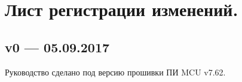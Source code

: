 \section*{ Лист регистрации изменений.}

\subsection*{v0 --- 05.09.2017}

Руководство сделано под версию прошивки ПИ MCU v7.62. 